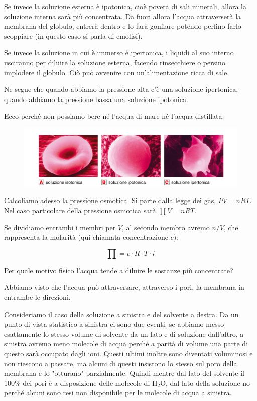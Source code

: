 Se invece la soluzione esterna è ipotonica, cioè povera di sali minerali, allora la soluzione interna sarà più concentrata. Da fuori allora l'acqua attraverserà la membrana del globulo, entrerà dentro e lo farà gonfiare potendo perfino farlo scoppiare (in questo caso si parla di emolisi).
 
Se invece la soluzione in cui è immerso è ipertonica, i liquidi al suo interno usciranno per diluire la soluzione esterna, facendo rinsecchiere o persino implodere il globulo. Ciò può avvenire con un'alimentazione ricca di sale.

Ne segue che quando abbiamo la pressione alta c'è una soluzione ipertonica, quando abbiamo la pressione bassa una soluzione ipotonica.

Ecco perché non possiamo bere né l'acqua di mare né l'acqua distillata.

\begin{figure}[htp]
    \centering
    \includegraphics[width=14cm]{immagini/sangue.png}
\end{figure}

Calcoliamo adesso la pressione osmotica.
Si parte dalla legge dei gas, $PV=nRT$. Nel caso particolare della pressione osmotica sarà $\textstyle \prod V=nRT$.

Se dividiamo entrambi i membri per $V$, al secondo membro avremo $n/V$, che rappresenta la molarità (qui chiamata concentrazione $c$):

$$\textstyle \prod = c \cdot R \cdot T \cdot i$$

Per quale motivo fisico l'acqua tende a diluire le sostanze più concentrate?

Abbiamo visto che l'acqua può attraversare, attraverso i pori, la membrana in entrambe le direzioni.

Consideriamo il caso della soluzione a sinistra e del solvente a destra. Da un punto di vista statistico a sinistra ci sono due eventi: se abbiamo messo esattamente lo stesso volume di solvente da un lato e di soluzione dall'altro, a sinistra avremo meno molecole di acqua perché a parità di volume una parte di questo sarà occupato dagli ioni. Questi ultimi inoltre sono diventati voluminosi e non riescono a passare, ma alcuni di questi insistono lo stesso sul poro della membrana e lo "otturano" parzialmente. Quindi mentre dal lato del solvente il 100\% dei pori è a disposizione delle molecole di H$_2$O, dal lato della soluzione no perché alcuni sono resi non disponibile per le molecole di acqua a sinistra.

